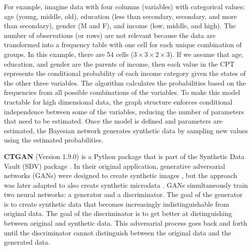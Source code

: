 \documentclass[runningheads]{llncs}
\begin{document}
For example, imagine data with four columns (variables) with categorical values: age (young, middle, old), education (less than secondary, secondary, and more than secondary), gender (M and F), and income (low, middle, and high).   The number of observations (or rows) are not relevant because the data are transformed into a frequency table with one cell for each unique combination of groups.  In this example, there are 54 cells  ($3 \times 3 \times 2\times 3$).  If we assume that age, education, and gender are the parents of income, then each value in the CPT represents the conditional probability of each income category given the states of the other three variables. The algorithm calculates the probabilities based on the frequencies from all possible combinations of the variables.  To make this model tractable for high dimensional data, the graph structure enforces conditional independence between some of the variables, reducing the number of parameters that need to be estimated. Once the model is defined and parameters are estimated, the Bayesian network generates synthetic data by sampling  new values using the estimated probabilities.  

{\bf CTGAN} (Version 1.9.0) \cite{ctgan} is a Python package that is part of the Synthetic Data Vault (SDV) package \cite{patki2016synthetic}.  In their original application, generative adversarial networks (GANs) were designed to create synthetic images  \cite{goodfellow2014generative}, but the approach was later adapted to also create synthetic microdata \cite{park2018data}.  GANs simultaneously train two neural networks: a generator and a discriminator. The goal of the generator is to create synthetic data that becomes increasingly indistinguishable from original data.  The goal of the discriminator is to get better at distinguishing between original and synthetic data.  This adversarial process goes back and forth until the discriminator cannot distinguish between the original data and the generated data.  
\end{document}
